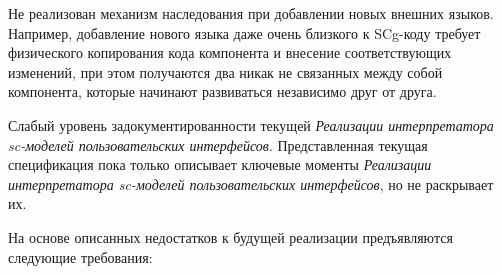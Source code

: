 \begin{textitemize}
	\item Не реализован механизм наследования при добавлении новых внешних языков. Например, добавление нового языка даже очень близкого к SCg-коду требует физического копирования кода компонента и внесение соответствующих изменений, при этом получаются два никак не связанных между собой компонента, которые начинают развиваться независимо друг от друга.
	\item Слабый уровень задокументированности текущей \textit{Реализации интерпретатора sc-моделей пользовательских интерфейсов}. Представленная текущая спецификация пока только описывает ключевые моменты \textit{Реализации интерпретатора sc-моделей пользовательских интерфейсов}, но не раскрывает их.
\end{textitemize}

На основе описанных недостатков к будущей реализации предъявляются следующие требования:
